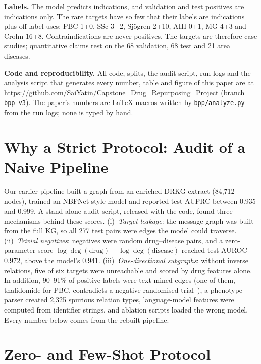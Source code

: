 \documentclass[journal]{IEEEtran}
\begin{document}
\textbf{Labels.} The model predicts indications, and validation and test positives are indications only. The rare targets have so few that their labels are indications plus off-label uses: PBC 1+0, SSc 3+2, Sj\"ogren 2+10, AIH 0+1, MG 4+3 and Crohn 16+8. Contraindications are never positives. The targets are therefore case studies; quantitative claims rest on the 68 validation, 68 test and 21 area diseases.

\textbf{Code and reproducibility.} All code, splits, the audit script, run logs and the analysis script that generates every number, table and figure of this paper are at \url{https://github.com/SaiYatin/Capstone_Drug_Repurposing_Project} (branch \texttt{bpp-v3}). The paper's numbers are \LaTeX{} macros written by \texttt{bpp/analyze.py} from the run logs; none is typed by hand.

\section{Why a Strict Protocol: Audit of a Naive Pipeline}
\label{sec:audit}
Our earlier pipeline built a graph from an enriched DRKG extract (84,712 nodes), trained an NBFNet-style model and reported test AUPRC between 0.935 and 0.999. A stand-alone audit script, released with the code, found three mechanisms behind these scores. (i)~\emph{Target leakage}: the message graph was built from the full KG, so all 277 test pairs were edges the model could traverse. (ii)~\emph{Trivial negatives}: negatives were random drug--disease pairs, and a zero-parameter score $\log\deg(\text{drug})+\log\deg(\text{disease})$ reached test AUROC 0.972, above the model's 0.941. (iii)~\emph{One-directional subgraphs}: without inverse relations, five of six targets were unreachable and scored by drug features alone. In addition, 90--91\% of positive labels were text-mined edges (one of them, thalidomide for PBC, contradicts a negative randomised trial~\cite{mccormick1994thalidomide}), a phenotype parser created 2,325 spurious relation types, language-model features were computed from identifier strings, and ablation scripts loaded the wrong model. Every number below comes from the rebuilt pipeline.

\section{Zero- and Few-Shot Protocol}
\label{sec:protocol}
\end{document}
